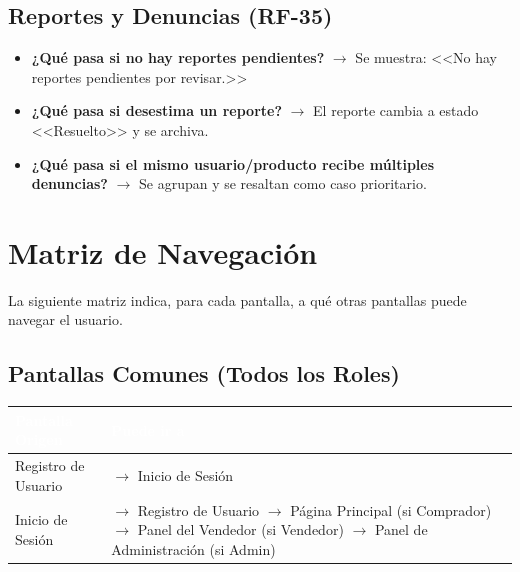 \documentclass[12pt,a4paper]{article}
\begin{document}
\subsection{Reportes y Denuncias (RF-35)}
\begin{itemize}
    \item \textbf{¿Qué pasa si no hay reportes pendientes?} $\rightarrow$ Se muestra: <<No hay reportes pendientes por revisar.>>
    \item \textbf{¿Qué pasa si desestima un reporte?} $\rightarrow$ El reporte cambia a estado <<Resuelto>> y se archiva.
    \item \textbf{¿Qué pasa si el mismo usuario/producto recibe múltiples denuncias?} $\rightarrow$ Se agrupan y se resaltan como caso prioritario.
\end{itemize}

\newpage

\section{Matriz de Navegación}

La siguiente matriz indica, para cada pantalla, a qué otras pantallas puede navegar el usuario.

\subsection{Pantallas Comunes (Todos los Roles)}
\begin{longtable}{|p{5cm}|p{9cm}|}
\hline
\rowcolor{darkbg}\textcolor{white}{\textbf{Pantalla Origen}} & \textcolor{white}{\textbf{Puede ir a}} \\
\hline
Registro de Usuario & $\rightarrow$ Inicio de Sesión \\
\hline
Inicio de Sesión & $\rightarrow$ Registro de Usuario \newline $\rightarrow$ Página Principal (si Comprador) \newline $\rightarrow$ Panel del Vendedor (si Vendedor) \newline $\rightarrow$ Panel de Administración (si Admin) \\
\hline
\end{longtable}
\end{document}
